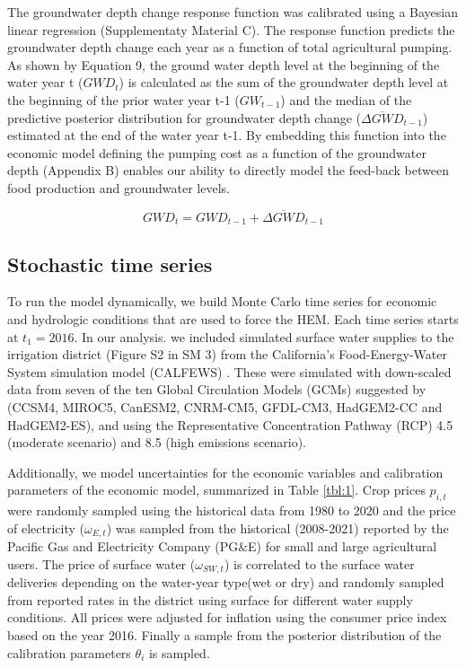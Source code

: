 \documentclass[a4paper,fleqn]{cas-sc}
\begin{document}
The groundwater depth change response function was calibrated using a Bayesian linear regression (Supplementaty Material C). The response function predicts the groundwater depth change each year as a function of total agricultural pumping. As shown by Equation 9, the ground water depth level at the beginning of the water year t ($GWD_{t}$) is calculated as the sum of the groundwater depth level at the beginning of the prior water year t-1 ($GW_{t-1}$)  and the median of the predictive posterior distribution for groundwater depth change ($\overline{\Delta GWD}_{t-1}$) estimated at the end of the water year t-1. By embedding this function into the economic model defining the pumping cost as a function of the groundwater depth (Appendix B) enables our ability to directly model the feed-back between food production and groundwater levels. 

\begin{equation}
GWD_{t} = GWD_{t-1} + \overline{\Delta GWD}_{t-1}
\end{equation}

\subsection{Stochastic time series}

To run the model dynamically, we build Monte Carlo time series for economic and hydrologic conditions that are used to force the HEM. Each time series starts at $t_{1}=2016$. In our analysis. we included simulated surface water supplies to the irrigation district (Figure S2 in SM 3) from the California’s Food-Energy-Water System simulation model (CALFEWS) \citep{zeff_californias_2021}. These were simulated with down-scaled data from seven of the ten Global Circulation Models (GCMs) suggested by \citet{pierce_climate_2018} (CCSM4, MIROC5, CanESM2, CNRM-CM5, GFDL-CM3, HadGEM2-CC and HadGEM2-ES), and using the Representative Concentration Pathway (RCP) 4.5 (moderate scenario) and 8.5 (high emissions scenario). 

Additionally, we model uncertainties for the economic variables and calibration parameters of the economic model, summarized in Table \ref{tbl:1}. Crop prices $p_{i,t}$ were randomly sampled using the historical data from 1980 to 2020 \citep{usda_national_2020} and the price of electricity ($\omega_{E,t}$) was sampled from the historical (2008-2021) reported by the Pacific Gas and Electricity Company (PG\&E) for small and large agricultural users. The price of surface water ($\omega_{SW,t}$) is correlated to the surface water deliveries depending on the water-year type(wet or dry) and randomly sampled from reported rates in the district using surface for different water supply conditions. All prices were adjusted for inflation using the consumer price index based on the year 2016. Finally a sample from the posterior distribution of the calibration parameters $\theta_{i}$ is sampled.
\end{document}
